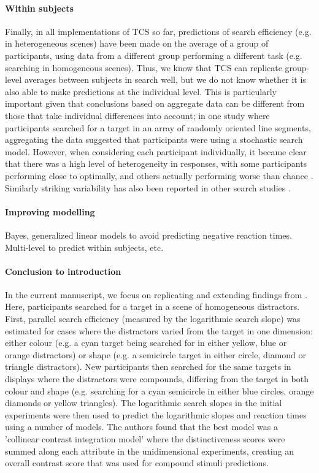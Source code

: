 \documentclass[smallextended]{svjour3}       %
\begin{document}
\paragraph{Within subjects}
Finally, in all implementations of TCS so far, predictions of search efficiency (e.g. in heterogeneous scenes) have been made on the average of a group of participants, using data from a different group performing a different task (e.g. searching in homogeneous scenes). Thus, we know that TCS can replicate group-level averages between subjects in search well, but we do not know whether it is also able to make predictions at the individual level. This is particularly important given that conclusions based on aggregate data can be different from those that take individual differences into account; in one study where participants searched for a target in an array of randomly oriented line segments, aggregating the data suggested that participants were using a stochastic search model. However, when considering each participant individually, it became clear that there was a high level of heterogeneity in responses, with some participants performing close to optimally, and others actually performing worse than chance \cite{nowakowska2017human}. Similarly striking variability has also been reported in other search studies \cite{irons2016choosing, irons2018characterizing}. 

\paragraph{Improving modelling} Bayes, generalized linear models to avoid predicting negative reaction times. Multi-level to predict within subjects, etc. 

\paragraph{Conclusion to introduction} 
In the current manuscript, we focus on replicating and extending findings from \cite{buetti2019predicting}. Here, participants searched for a target in a scene of homogeneous distractors. First, parallel search efficiency (measured by the logarithmic search slope) was estimated for cases where the distractors varied from the target in one dimension: either colour (e.g. a cyan target being searched for in either yellow, blue or orange distractors) or shape (e.g. a semicircle target in either circle, diamond or triangle distractors). New participants then searched for the same targets in displays where the distractors were compounds, differing from the target in both colour and shape (e.g. searching for a cyan semicircle in either blue circles, orange diamonds or yellow triangles). The logarithmic search slopes in the initial experiments were then used to predict the logarithmic slopes and reaction times using a number of models. The authors found that the best model was a 'collinear contrast integration model' where the distinctiveness scores were summed along each attribute in the unidimensional experiments, creating an overall contrast score that was used for compound stimuli predictions.
\end{document}
